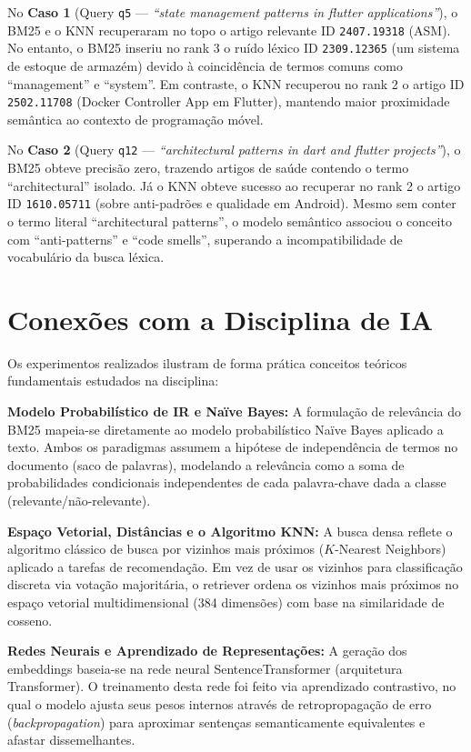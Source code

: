 \documentclass[12pt]{article}
\begin{document}
No \textbf{Caso 1} (Query \texttt{q5} --- \textit{``state management patterns in flutter applications''}), o BM25 e o KNN recuperaram no topo o artigo relevante ID \texttt{2407.19318} (ASM). No entanto, o BM25 inseriu no rank 3 o ruído léxico ID \texttt{2309.12365} (um sistema de estoque de armazém) devido à coincidência de termos comuns como ``management'' e ``system''. Em contraste, o KNN recuperou no rank 2 o artigo ID \texttt{2502.11708} (Docker Controller App em Flutter), mantendo maior proximidade semântica ao contexto de programação móvel.

No \textbf{Caso 2} (Query \texttt{q12} --- \textit{``architectural patterns in dart and flutter projects''}), o BM25 obteve precisão zero, trazendo artigos de saúde contendo o termo ``architectural'' isolado. Já o KNN obteve sucesso ao recuperar no rank 2 o artigo ID \texttt{1610.05711} (sobre anti-padrões e qualidade em Android). Mesmo sem conter o termo literal ``architectural patterns'', o modelo semântico associou o conceito com ``anti-patterns'' e ``code smells'', superando a incompatibilidade de vocabulário da busca léxica.

\section{Conexões com a Disciplina de IA}

Os experimentos realizados ilustram de forma prática conceitos teóricos fundamentais estudados na disciplina:

\noindent\textbf{Modelo Probabilístico de IR e Naïve Bayes:} A formulação de relevância do BM25 mapeia-se diretamente ao modelo probabilístico Naïve Bayes aplicado a texto. Ambos os paradigmas assumem a hipótese de independência de termos no documento (saco de palavras), modelando a relevância como a soma de probabilidades condicionais independentes de cada palavra-chave dada a classe (relevante/não-relevante).

\noindent\textbf{Espaço Vetorial, Distâncias e o Algoritmo KNN:} A busca densa reflete o algoritmo clássico de busca por vizinhos mais próximos ($K$-Nearest Neighbors) aplicado a tarefas de recomendação. Em vez de usar os vizinhos para classificação discreta via votação majoritária, o retriever ordena os vizinhos mais próximos no espaço vetorial multidimensional (384 dimensões) com base na similaridade de cosseno.

\noindent\textbf{Redes Neurais e Aprendizado de Representações:} A geração dos embeddings baseia-se na rede neural SentenceTransformer (arquitetura Transformer). O treinamento desta rede foi feito via aprendizado contrastivo, no qual o modelo ajusta seus pesos internos através de retropropagação de erro (\textit{backpropagation}) para aproximar sentenças semanticamente equivalentes e afastar dissemelhantes.
\end{document}
